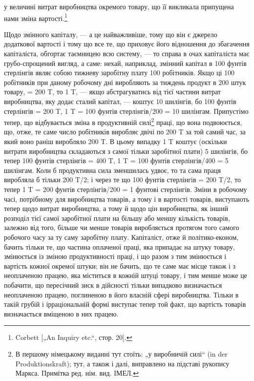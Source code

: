 \parcont{}  %
у величині витрат виробництва окремого товару, що її викликала припущена нами зміна вартості.\footnote{
Corbett [„An Inquiry etc.“, стор. 20].
}

Щодо змінного капіталу, — а це найважливіше, тому що він
є джерело додаткової вартості і тому що все те, що приховує
його відношення до збагачення капіталіста, обгортає таємницею
всю систему, — то справа в очах капіталіста має грубо-спрощений вигляд, а саме: нехай, наприклад,
змінний капітал в 100 фунтів стерлінгів являє собою тижневу заробітну плату 100 робітників. Якщо ці
100 робітників при даному робочому дні виробляють за тиждень продукт в 200 штук товару, = 200 T, то
1 T, — якщо абстрагуватись від тієї частини витрат виробництва,
яку додає сталий капітал, — коштує 10 шилінгів, бо 100 фунтів стерлінгів = 200 T, 1 T = 100 фунтів
стерлінгів/200 = 10 шилінгам. Припустімо тепер, що відбувається зміна в продуктивній силі\footnote*{
В першому німецькому виданні тут стоїть: „у виробничій силі“ (in der
Produktionskraft); тут, а також і далі, виправлено на підставі рукопису Маркса.
Примітка ред. нім. вид. ІМЕЛ.
} праці,
що вона подвоюється, що, отже, те саме число робітників виробляє двічі по 200 T за той самий час, за
який воно раніш
виробляло 200 T. В цьому випадку 1 T коштує (оскільки витрати виробництва складаються з самої тільки
заробітної плати)
5 шилінгів, бо тепер 100 фунтів стерлінгів = 400 T, 1 T = 100 фунтів стерлінгів/400 = 5 шилінгам.
Коли б продуктивна сила
зменшилась удвоє, то та сама праця виробляла б тільки 200 T/2; і через те що 100 фунтів стерлінгів =
200 T/2, то тепер 1 T = 200 фунтів стерлінгів/200 = 1 фунтові стерлінгів. Зміни в робочому
часі, потрібному для виробництва товарів, а тому і в вартості
товарів, виступають тепер щодо витрат виробництва, а тому
й щодо цін виробництва, як інший розподіл тієї самої заробітної
плати на більшу або меншу кількість товарів, залежно від того,
більше чи менше товарів виробляється протягом того самого
робочого часу за ту саму заробітну плату. Капіталіст, отже
й політико-економ, бачить тільки те, що частина оплаченої праці,
яка припадає на штуку товару, змінюється із зміною продуктивності праці, і
що разом з тим змінюється і вартість кожної
окремої штуки; він не бачить, що те саме має місце також і з неоплаченою працею, яка міститься в
кожній штуці товару, і тим
менше може це побачити, що пересічний зиск в дійсності тільки
випадково визначається неоплаченою працею, поглиненою в його
власній сфері виробництва. Тільки в такій грубій і ірраціональній
формі виступає тепер той факт, що вартість товарів визначається вміщеною в них працею.
